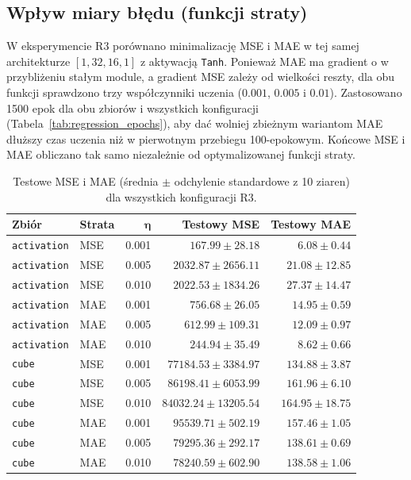\documentclass[11pt,a4paper]{article}
\begin{document}
\subsection{Wpływ miary błędu (funkcji straty)}
W eksperymencie R3 porównano minimalizację MSE i MAE w tej samej architekturze $[1,32,16,1]$ z aktywacją \texttt{Tanh}. Ponieważ MAE ma gradient o w przybliżeniu stałym module, a gradient MSE zależy od wielkości reszty, dla obu funkcji sprawdzono trzy współczynniki uczenia ($0.001$, $0.005$ i $0.01$). Zastosowano 1500 epok dla obu zbiorów i wszystkich konfiguracji (Tabela~\ref{tab:regression_epochs}), aby dać wolniej zbieżnym wariantom MAE dłuższy czas uczenia niż w pierwotnym przebiegu 100-epokowym. Końcowe MSE i MAE obliczano tak samo niezależnie od optymalizowanej funkcji straty.

\begin{table}[H]
    \centering
    \small
    \caption{Testowe MSE i MAE (średnia $\pm$ odchylenie standardowe z 10 ziaren) dla wszystkich konfiguracji R3.}
    \label{tab:r3_regression}
    \begin{tabular}{llrrr}
        \toprule
        \textbf{Zbiór} & \textbf{Strata} & $\boldsymbol{\eta}$ & \textbf{Testowy MSE} & \textbf{Testowy MAE} \\
        \midrule
        \texttt{activation} & MSE & 0.001 & $167.99 \pm 28.18$ & $6.08 \pm 0.44$ \\
        \texttt{activation} & MSE & 0.005 & $2032.87 \pm 2656.11$ & $21.08 \pm 12.85$ \\
        \texttt{activation} & MSE & 0.010 & $2022.53 \pm 1834.26$ & $27.37 \pm 14.47$ \\
        \texttt{activation} & MAE & 0.001 & $756.68 \pm 26.05$ & $14.95 \pm 0.59$ \\
        \texttt{activation} & MAE & 0.005 & $612.99 \pm 109.31$ & $12.09 \pm 0.97$ \\
        \texttt{activation} & MAE & 0.010 & $244.94 \pm 35.49$ & $8.62 \pm 0.66$ \\
        \midrule
        \texttt{cube} & MSE & 0.001 & $77184.53 \pm 3384.97$ & $134.88 \pm 3.87$ \\
        \texttt{cube} & MSE & 0.005 & $86198.41 \pm 6053.99$ & $161.96 \pm 6.10$ \\
        \texttt{cube} & MSE & 0.010 & $84032.24 \pm 13205.54$ & $164.95 \pm 18.75$ \\
        \texttt{cube} & MAE & 0.001 & $95539.71 \pm 502.19$ & $157.46 \pm 1.05$ \\
        \texttt{cube} & MAE & 0.005 & $79295.36 \pm 292.17$ & $138.61 \pm 0.69$ \\
        \texttt{cube} & MAE & 0.010 & $78240.59 \pm 602.90$ & $138.58 \pm 1.06$ \\
        \bottomrule
    \end{tabular}
\end{table}
\end{document}
